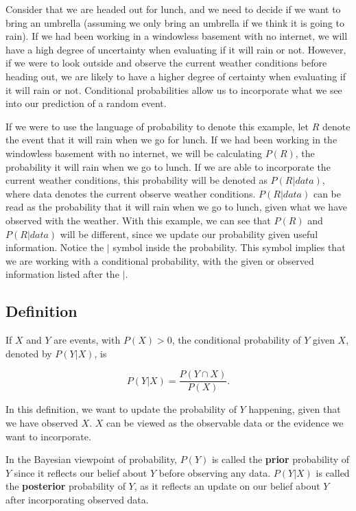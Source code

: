 \documentclass[
]{book}
\begin{document}
Consider that we are headed out for lunch, and we need to decide if we want to bring an umbrella (assuming we only bring an umbrella if we think it is going to rain). If we had been working in a windowless basement with no internet, we will have a high degree of uncertainty when evaluating if it will rain or not. However, if we were to look outside and observe the current weather conditions before heading out, we are likely to have a higher degree of certainty when evaluating if it will rain or not. Conditional probabilities allow us to incorporate what we see into our prediction of a random event.

If we were to use the language of probability to denote this example, let \(R\) denote the event that it will rain when we go for lunch. If we had been working in the windowless basement with no internet, we will be calculating \(P(R)\), the probability it will rain when we go to lunch. If we are able to incorporate the current weather conditions, this probability will be denoted as \(P(R|data)\), where data denotes the current observe weather conditions. \(P(R|data)\) can be read as the probability that it will rain when we go to lunch, given what we have observed with the weather. With this example, we can see that \(P(R)\) and \(P(R|data)\) will be different, since we update our probability given useful information. Notice the \(|\) symbol inside the probability. This symbol implies that we are working with a conditional probability, with the given or observed information listed after the \(|\).

\subsection{Definition}\label{def}

If \(X\) and \(Y\) are events, with \(P(X)>0\), the conditional probability of \(Y\) given \(X\), denoted by \(P(Y|X)\), is

\begin{equation} 
P(Y|X) = \frac{P(Y \cap X)}{P(X)}.
\label{eq:cond}
\end{equation}

In this definition, we want to update the probability of \(Y\) happening, given that we have observed \(X\). \(X\) can be viewed as the observable data or the evidence we want to incorporate.

In the Bayesian viewpoint of probability, \(P(Y)\) is called the \textbf{prior} probability of \(Y\) since it reflects our belief about \(Y\) before observing any data. \(P(Y|X)\) is called the \textbf{posterior} probability of \(Y\), as it reflects an update on our belief about \(Y\) after incorporating observed data.
\end{document}
